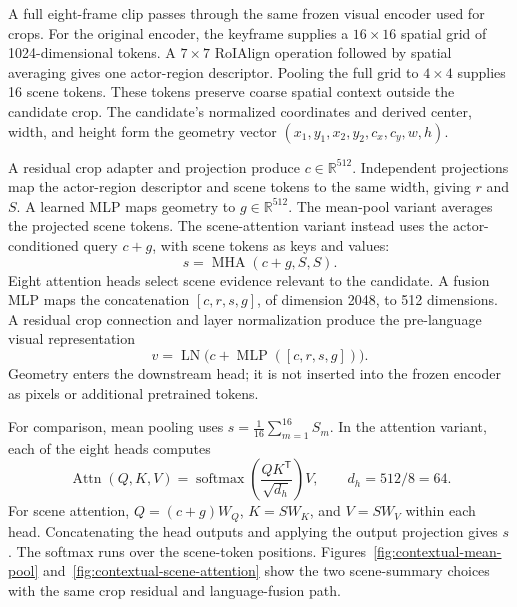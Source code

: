 A full eight-frame clip passes through the same frozen visual encoder used for crops. For the original encoder, the keyframe supplies a \(16\times16\) spatial grid of 1024-dimensional tokens. A \(7\times7\) RoIAlign operation followed by spatial averaging gives one actor-region descriptor. Pooling the full grid to \(4\times4\) supplies 16 scene tokens. These tokens preserve coarse spatial context outside the candidate crop. The candidate's normalized coordinates and derived center, width, and height form the geometry vector \((x_1,y_1,x_2,y_2,c_x,c_y,w,h)\).

A residual crop adapter and projection produce \(c\in\mathbb{R}^{512}\). Independent projections map the actor-region descriptor and scene tokens to the same width, giving \(r\) and \(S\). A learned MLP maps geometry to \(g\in\mathbb{R}^{512}\). The mean-pool variant averages the projected scene tokens. The scene-attention variant instead uses the actor-conditioned query \(c+g\), with scene tokens as keys and values:
\begin{equation}\label{eq:scene-attention}
 s=\operatorname{MHA}(c+g,S,S).
\end{equation}
Eight attention heads select scene evidence relevant to the candidate. A fusion MLP maps the concatenation \([c,r,s,g]\), of dimension 2048, to 512 dimensions. A residual crop connection and layer normalization produce the pre-language visual representation
\begin{equation}\label{eq:visual-fusion}
 v=\operatorname{LN}\big(c+\operatorname{MLP}([c,r,s,g])\big).
\end{equation}
Geometry enters the downstream head; it is not inserted into the frozen encoder as pixels or additional pretrained tokens.

For comparison, mean pooling uses \(s=\frac{1}{16}\sum_{m=1}^{16}S_m\). In the attention variant, each of the eight heads computes
\begin{equation}\label{eq:attention}
 \operatorname{Attn}(Q,K,V)=\operatorname{softmax}\!\left(\frac{QK^{\mathsf T}}{\sqrt{d_h}}\right)V,
 \qquad d_h=512/8=64.
\end{equation}
For scene attention, \(Q=(c+g)W_Q\), \(K=SW_K\), and \(V=SW_V\) within each head. Concatenating the head outputs and applying the output projection gives \(s\). The softmax runs over the scene-token positions. Figures~\ref{fig:contextual-mean-pool} and~\ref{fig:contextual-scene-attention} show the two scene-summary choices with the same crop residual and language-fusion path.

